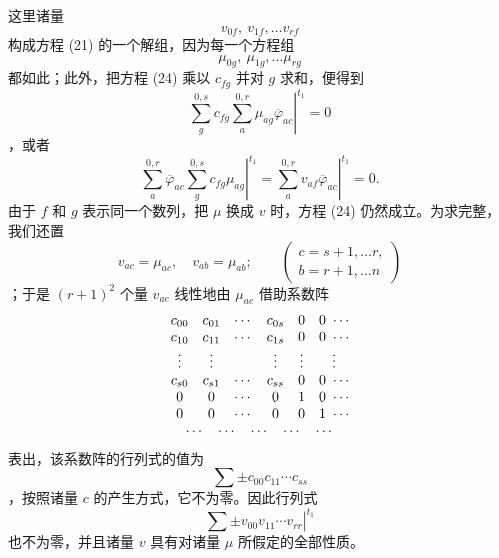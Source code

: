 \documentclass[11pt,a4paper,leqno]{article}
\begin{document}
这里诸量
\[
v_{0f},\ v_{1f},\ldots v_{rf}
\]
构成方程 (21) 的一个解组，因为每一个方程组
\[
\mu_{0g},\ \mu_{1g},\ldots\mu_{rg}
\]
都如此；此外，把方程 (24) 乘以 $c_{fg}$ 并对 $g$ 求和，便得到
\[
\left.
\sum_g^{0,s}c_{fg}\sum_a^{0,r}\mu_{ag}\overline{\varphi}_{ac}
\right|^{t_1}=0
\]
，或者
\[
\left.
\sum_a^{0,r}\overline{\varphi}_{ac}\sum_g^{0,s}c_{fg}\mu_{ag}
\right|^{t_1}
=
\left.\sum_a^{0,r}v_{af}\overline{\varphi}_{ac}\right|^{t_1}=0.
\]
由于 $f$ 和 $g$ 表示同一个数列，把 $\mu$ 换成 $v$ 时，方程 (24) 仍然成立。为求完整，我们还置
\[
v_{ac}=\mu_{ac},\quad v_{ab}=\mu_{ab};
\qquad
\left(
\begin{gathered}
c=s+1,\ldots r,\\
b=r+1,\ldots n
\end{gathered}
\right)
\]
；于是 $(r+1)^2$ 个量 $v_{ae}$ 线性地由 $\mu_{ae}$ 借助系数阵
\[
\begin{array}{cccccc}
c_{00}&c_{01}&\cdots&c_{0s}&0&0\ \cdots\\
c_{10}&c_{11}&\cdots&c_{1s}&0&0\ \cdots\\
\vdots&\vdots&&\vdots&\vdots&\vdots\\
c_{s0}&c_{s1}&\cdots&c_{ss}&0&0\ \cdots\\
0&0&\cdots&0&1&0\ \cdots\\
0&0&\cdots&0&0&1\ \cdots\\
\multicolumn{6}{c}{\cdots\quad\cdots\quad\cdots\quad\cdots\quad\cdots}
\end{array}
\]
表出，该系数阵的行列式的值为
\[
\sum\mathord{\pm}c_{00}c_{11}\cdots c_{ss}
\]
，按照诸量 $c$ 的产生方式，它不为零。因此行列式
\[
\left.\sum\mathord{\pm}v_{00}v_{11}\cdots v_{rr}\right|^{t_1}
\]
也不为零，并且诸量 $v$ 具有对诸量 $\mu$ 所假定的全部性质。
\end{document}

